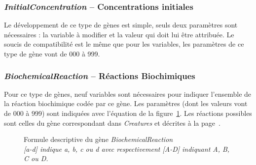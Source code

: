 \documentclass[11pt,twoside,a4paper]{article}
\begin{document}
\subsubsection{\emph{InitialConcentration} -- Concentrations initiales}

Le d{\'e}veloppement de ce type de g{\`e}nes est simple, seuls deux param{\`e}tres sont n{\'e}cessaires : la variable {\`a} modifier et la valeur qui doit lui {\^e}tre attribu{\'e}e. Le soucis de compatibilit{\'e} est le m{\^e}me que pour les variables, les param{\`e}tres de ce type de g{\`e}ne vont de 000 {\`a} 999.

\subsubsection{\emph{BiochemicalReaction} -- R{\'e}actions Biochimiques}

Pour ce type de g{\`e}nes, neuf variables sont n{\'e}cessaires pour indiquer l'ensemble de la r{\'e}action biochimique cod{\'e}e par ce g{\`e}ne. Les param{\`e}tres (dont les valeurs vont de 000 {\`a} 999) sont indiqu{\'e}es avec l'{\'e}quation de la figure~\ref{fig:BiochemicalReactionDescription}. Les r{\'e}actions possibles sont celles du g{\`e}ne correspondant dans \emph{Creatures} et  d{\'e}crites {\`a} la page~\pageref{creatures:reactions}.

\begin{figure}[H]
\begin{center}
	\caption[Formule descriptive du g{\`e}ne \emph{BiochemicalReaction}]
	{ Formule descriptive du g{\`e}ne \emph{BiochemicalReaction}~\\
	  \emph{[a-d] indique a, b, c ou d avec respectivement [A-D] indiquant A, B, C ou D.} }
	\label{fig:BiochemicalReactionDescription}
\end{center}
\end{figure}
\end{document}
